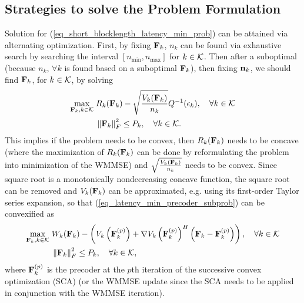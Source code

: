 \documentclass[a4paper, 12pt, onecolumn, journal, twoside, draftclsnofoot]{IEEEtran}
\begin{document}
\subsection{Strategies to solve the Problem Formulation}
Solution for (\ref{eq_short_blocklength_latency_min_prob}) can be attained via alternating optimization.  First, by fixing ${\bf F}_k$, $n_k$ can be found via exhaustive search by searching the interval $\left[ n_{\min}, n_{\max} \right]$ for $k \in { \mathcal{K} }$.  Then after a suboptimal (because $n_k$, $\forall k$ is found based on a suboptimal ${\bf F}_k$), then fixing ${\bf n}_k$, we should find ${\bf F}_k$, for $k \in { \mathcal{K} }$, by solving 
\begin{equation}
	\begin{split}
		\max_{{\bf F}_k, k \in { \mathcal{K} }} &\; R_k({\bf F}_k) - \sqrt{ \frac{ V_k({\bf F}_k) }{ n_k }  } Q^{-1}(\epsilon_k), \quad \forall k \in { \mathcal{K} } \\
		& \; \left\| {\bf F}_k \right\|_F^2 \leq P_k, \quad \forall k \in { \mathcal{K} }.
	\end{split}
\label{eq_latency_min_precoder_subprob}
\end{equation}
This implies if the problem needs to be convex, then $R_k({\bf F}_k)$ needs to be concave (where the maximization of $R_k({\bf F}_k)$ can be done by reformulating the problem into minimization of the WMMSE) and $\sqrt{ \frac{ V_k({\bf F}_k) }{ n_k } }$ needs to be convex.  Since square root is a monotonically nondecreasing concave function, the square root can be removed and $V_k({\bf F}_k)$ can be approximated, e.g. using its first-order Taylor series expansion, so that (\ref{eq_latency_min_precoder_subprob}) can be convexified as
\begin{equation}
	\begin{split}
		\max_{{\bf F}_k, k \in { \mathcal{K} }} &\; W_k({\bf F}_k) - \left( V_k \left( {\bf F}_k^{(p)} \right) + \nabla V_k \left( {\bf F}_k^{(p)} \right)^H  \left( {\bf F}_k - {\bf F}_k^{(p)} \right) \right), \quad \forall k \in { \mathcal{K} } \\
		& \; \left\| {\bf F}_k \right\|_F^2 \leq P_k, \quad \forall k \in { \mathcal{K} },
	\end{split}
\label{eq_latency_min_precoder_subprob_cvx}
\end{equation}
where ${\bf F}_k^{(p)}$ is the precoder at the $p$th iteration of the successive convex optimization (SCA) (or the WMMSE update since the SCA needs to be applied in conjunction with the WMMSE iteration).  
\end{document}
